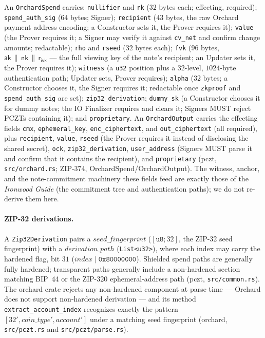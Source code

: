 \documentclass[11pt,a4paper]{article}
\theoremstyle{definition}
\newcommand{\aksym}{\ensuremath{\mathsf{ak}}}
\newcommand{\nksym}{\ensuremath{\mathsf{nk}}}
\newcommand{\rivk}{\ensuremath{\mathsf{r_{ivk}}}}
\begin{document}
An \texttt{OrchardSpend} carries: \texttt{nullifier} and \texttt{rk}
($32$ bytes each; effecting, required); \texttt{spend\_auth\_sig} ($64$
bytes; Signer); \texttt{recipient} ($43$ bytes, the raw Orchard payment
address encoding; a Constructor sets it, the Prover requires it);
\texttt{value} (the Prover requires it; a Signer may verify it against
\texttt{cv\_net} and confirm change amounts; redactable); \texttt{rho}
and \texttt{rseed} ($32$ bytes each); \texttt{fvk} ($96$ bytes,
$\aksym \,\|\, \nksym \,\|\, \rivk$ --- the full viewing key of the
note's recipient; an Updater sets it, the Prover requires it);
\texttt{witness} (a \texttt{u32} position plus a $32$-level, $1024$-byte
authentication path; Updater sets, Prover requires); \texttt{alpha}
($32$ bytes; a Constructor chooses it, the Signer requires it; redactable
once \texttt{zkproof} and \texttt{spend\_auth\_sig} are set);
\texttt{zip32\_derivation}; \texttt{dummy\_sk} (a Constructor chooses it
for dummy notes; the IO Finalizer requires and clears it; Signers MUST
reject PCZTs containing it); and \texttt{proprietary}. An
\texttt{OrchardOutput} carries the effecting fields \texttt{cmx},
\texttt{ephemeral\_key}, \texttt{enc\_ciphertext}, and
\texttt{out\_ciphertext} (all required), plus \texttt{recipient},
\texttt{value}, \texttt{rseed} (the Prover requires it instead of
disclosing the shared secret), \texttt{ock}, \texttt{zip32\_derivation},
\texttt{user\_address} (Signers MUST parse it and confirm that it
contains the recipient), and \texttt{proprietary} (\textsf{pczt},
\texttt{src/orchard.rs}; ZIP-374, OrchardSpend/OrchardOutput). The
witness, anchor, and the note-commitment machinery these fields feed are
exactly those of the \emph{Ironwood Guide} (the commitment tree and
authentication paths); we do not re-derive them here.

\paragraph{ZIP-32 derivations.} A \texttt{Zip32Derivation} pairs a
$\mathit{seed\_fingerprint}$ ($[\mathtt{u8};32]$, the ZIP-32 seed
fingerprint) with a $\mathit{derivation\_path}$ (\texttt{List<u32>}),
where each index may carry the hardened flag, bit $31$
($\mathit{index} \mathbin{|} \mathtt{0x80000000}$). Shielded
spend paths are generally fully hardened; transparent paths generally
include a non-hardened section matching BIP~44 or the ZIP-320
ephemeral-address path (\textsf{pczt}, \texttt{src/common.rs}). The
\textsf{orchard} crate rejects any non-hardened component at parse time
--- Orchard does not support non-hardened derivation --- and its method
\texttt{extract\_account\_index} recognizes exactly the
pattern $[32', \mathit{coin\_type}', \mathit{account}']$ under a matching
seed fingerprint (\textsf{orchard}, \texttt{src/pczt.rs} and
\texttt{src/pczt/parse.rs}).
\end{document}
